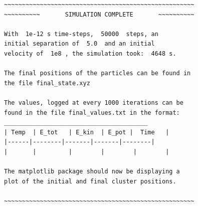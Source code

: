 \documentclass{article}
\begin{document}
\begin{figure}[!h]
\center
\captionsetup{font=footnotesize,singlelinecheck=on}
\end{figure}
\captionsetup[lstlisting]{position=bottom,font=footnotesize}
\renewcommand{\lstlistingname}{Code}
\begin{lstlisting}
~~~~~~~~~~~~~~~~~~~~~~~~~~~~~~~~~~~~~~~~~~~~~~~~~~~~~
~~~~~~~~~~       SIMULATION COMPLETE       ~~~~~~~~~~

With  1e-12 s time-steps,  50000  steps, an
initial separation of  5.0  and an initial
velocity of  1e8 , the simulation took:  4648 s.

The final positions of the particles can be found in
the file final_state.xyz

The values, logged at every 1000 iterations can be
found in the file final_values.txt in the format:
________________________________________
| Temp  | E_tot   | E_kin  | E_pot |  Time   |
|------|--------|-------|-------|--------|
|       |         |        |        |        |

The matplotlib package should now be displaying a
plot of the initial and final cluster positions.

~~~~~~~~~~~~~~~~~~~~~~~~~~~~~~~~~~~~~~~~~~~~~~~~~~~~~
\end{lstlisting}
\renewcommand{\lstlistingname}{Table}
\end{document}
